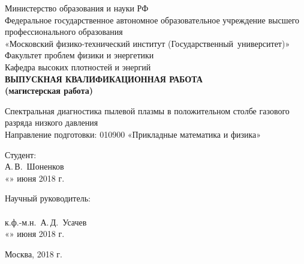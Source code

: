 \begin{center}
    Министерство образования и науки РФ\\
    Федеральное государственное автономное образовательное учреждение высшего профессионального образования\\
    «Московский физико-технический институт (Государственный~университет)»\\[15mm]

    Факультет проблем физики и энергетики\\
    Кафедра высоких плотностей и энергий\\[20mm]

    \textbf{
        ВЫПУСКНАЯ КВАЛИФИКАЦИОННАЯ РАБОТА\\
        (магистерская работа)\\[10mm]
    }

    Спектральная диагностика пылевой плазмы в положительном столбе газового разряда низкого давления\\[10mm]

Направление подготовки: 010900 «Прикладные математика и физика»\\[20mm]
\end{center}

\newlength{\ML}
\hfill\begin{minipage}{0.5\textwidth}
  Студент:\\
  \underline{\hspace{\ML}} А.\,В.~Шоненков\\
  «\underline{\hspace{0.7cm}}» июня 2018 г.\\[5mm]
\end{minipage}%

\hfill\begin{minipage}{0.5\textwidth}
  Научный руководитель:\\
  \underline{\hspace{\ML}}\\к.ф.-м.н.~А.\,Д.~Усачев\\
  «\underline{\hspace{0.7cm}}» июня 2018 г.
\end{minipage}%

\vfill

\begin{center}
  Москва, 2018 г.
\end{center}

\thispagestyle{empty}
